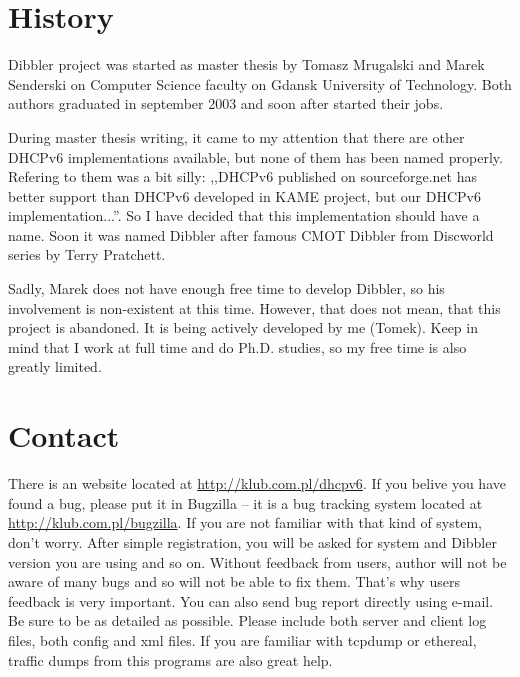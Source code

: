
\section{History}
 Dibbler project was started as master thesis by Tomasz Mrugalski and
Marek Senderski on Computer Science faculty on Gdansk University of
Technology. Both authors graduated in september 2003 and soon after
started their jobs. 

During master thesis writing, it came to my attention that there are
other DHCPv6 implementations available, but none of them has been
named properly. Refering to them was a bit
silly: ,,DHCPv6 published on sourceforge.net has better support than
DHCPv6 developed in KAME project, but our DHCPv6
implementation...''. So I have decided that this implementation should
have a name. Soon it was named Dibbler after famous CMOT
Dibbler from Discworld series by Terry Pratchett.

Sadly, Marek does not have enough free time to develop Dibbler, so his
involvement is non-existent at this time. However, that does not mean,
that this project is abandoned. It is being actively developed by
me (Tomek). Keep in mind that I work at full time and do
Ph.D. studies, so my free time is also greatly limited.

\section{Contact}
There is an website located at \url{http://klub.com.pl/dhcpv6}. If
you belive you have found a bug, please put it in Bugzilla -- it is a
bug tracking system located at \url{http://klub.com.pl/bugzilla}. If
you are not familiar with that kind of system, don't worry. After
simple registration, you will be asked for system and Dibbler version
you are using and so on. Without feedback from users, author will not
be aware of many bugs and so will not be able to fix them. That's why
users feedback is very important. You can also send bug report
directly using e-mail. Be sure to be as detailed as possible. Please
include both server and client log files, both config and xml
files. If you are familiar with tcpdump or ethereal, traffic dumps
from this programs are also great help.

